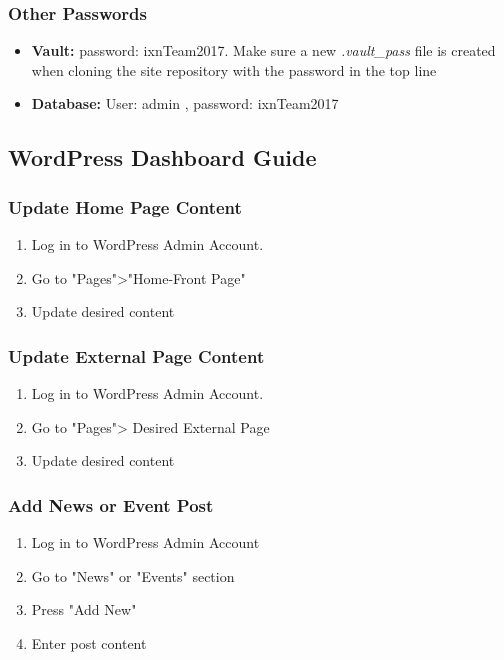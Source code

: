 \subsubsection{Other Passwords}
\begin{itemize}

  \item \textbf{Vault:} password: ixnTeam2017. Make sure a new \textit{.vault\_pass} file is created when cloning the site repository with the password in the top line
  \item \textbf{Database:} User: admin , password: ixnTeam2017

\end{itemize}

\subsection{WordPress Dashboard Guide}
\subsubsection{Update Home Page Content}

\begin{enumerate}

  \item Log in to WordPress Admin Account.
  \item Go to "Pages">"Home-Front Page"
  \item Update desired content

\end{enumerate}

\subsubsection{Update External Page Content}
\begin{enumerate}

  \item Log in to WordPress Admin Account.
  \item Go to "Pages"> Desired External Page
  \item Update desired content

\end{enumerate}

\subsubsection{Add News or Event Post}
\begin{enumerate}

  \item Log in to WordPress Admin Account
  \item Go to "News" or "Events" section
  \item Press "Add New"
  \item Enter post content

\end{enumerate}

